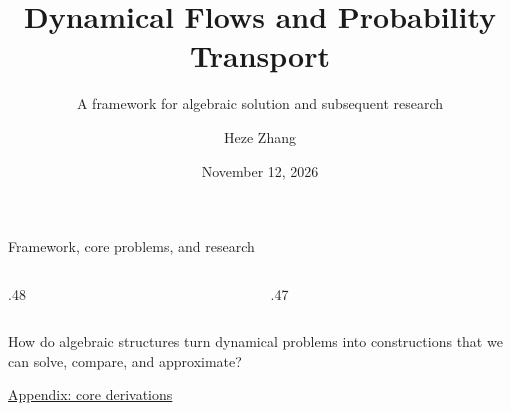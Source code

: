 \documentclass[9pt]{beamer}
\title{Dynamical Flows and Probability Transport}
\subtitle{A framework for algebraic solution and subsequent research}
\author{Heze Zhang}
\date{November 12, 2026}
\newcommand{\sectionroot}{sections/}
\begin{document}
\begin{frame}[plain]
\hypertarget{cover}{}
\slidecite{}
\titlepage
\end{frame}

\begin{frame}[t]{Framework, core problems, and research}
\begin{columns}[T,onlytextwidth]
  \begin{column}{.48\textwidth}
    \tableofcontents[sections={1-3},hideallsubsections]
  \end{column}
  \begin{column}{.47\textwidth}
    \tableofcontents[sections={4-6},hideallsubsections]
  \end{column}
\end{columns}
\medskip
{}
How do algebraic structures turn dynamical problems into constructions that we can
solve, compare, and approximate?
\par\medskip
\hyperlink{app:algebras}{\textcolor{accent}{Appendix: core derivations}}
\end{frame}








\appendix

\end{document}
